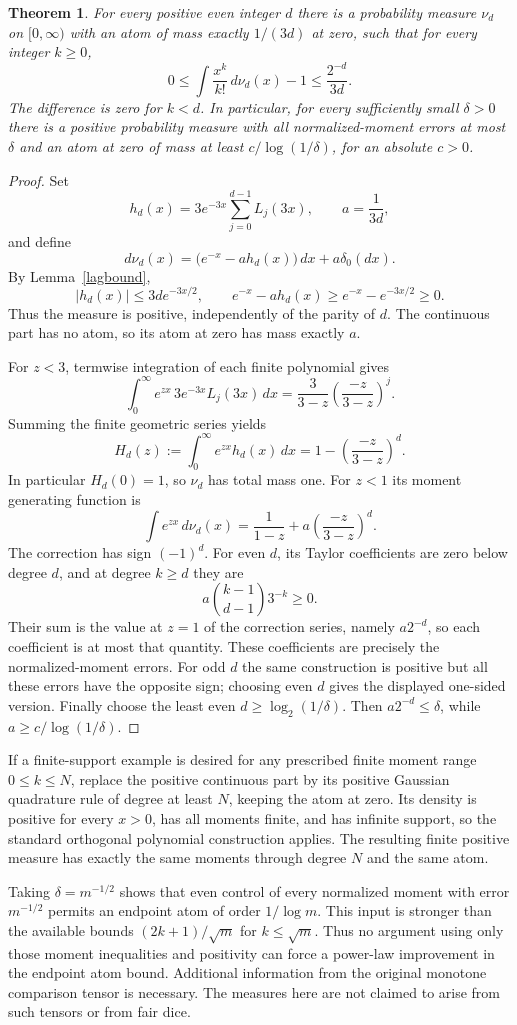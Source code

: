 \documentclass[11pt]{article}
\newtheorem{theorem}{Theorem}
\begin{document}
\begin{theorem}\label{barrier}
For every positive even integer $d$ there is a probability measure
$\nu_d$ on $[0,\infty)$ with an atom of mass exactly $1/(3d)$ at zero,
such that for every integer $k\ge0$,
\[
 0\le\int\frac{x^k}{k!}\,d\nu_d(x)-1
 \le\frac{2^{-d}}{3d}.
\]
The difference is zero for $k<d$. In particular, for every sufficiently
small $\delta>0$ there is a positive probability measure with all
normalized-moment errors at most $\delta$ and an atom at zero of mass
at least $c/\log(1/\delta)$, for an absolute $c>0$.
\end{theorem}
\begin{proof}
Set
\[
 h_d(x)=3e^{-3x}\sum_{j=0}^{d-1}L_j(3x),\qquad a=\frac1{3d},
\]
and define
\[
 d\nu_d(x)=\bigl(e^{-x}-a h_d(x)\bigr)\,dx+a\delta_0(dx).
\]
By Lemma~\ref{lagbound},
\[
 |h_d(x)|\le3d e^{-3x/2},\qquad
 e^{-x}-a h_d(x)\ge e^{-x}-e^{-3x/2}\ge0.
\]
Thus the measure is positive, independently of the parity of $d$.
The continuous part has no atom, so its atom at zero has mass exactly
$a$.

For $z<3$, termwise integration of each finite polynomial gives
\[
 \int_0^\infty e^{zx}\,3e^{-3x}L_j(3x)\,dx
 =\frac{3}{3-z}\left(\frac{-z}{3-z}\right)^j.
\]
Summing the finite geometric series yields
\[
 H_d(z):=\int_0^\infty e^{zx}h_d(x)\,dx
 =1-\left(\frac{-z}{3-z}\right)^d.
\]
In particular $H_d(0)=1$, so $\nu_d$ has total mass one.
For $z<1$ its moment generating function is
\[
 \int e^{zx}\,d\nu_d(x)
 =\frac1{1-z}+a\left(\frac{-z}{3-z}\right)^d.
\]
The correction has sign $(-1)^d$. For even $d$, its Taylor
coefficients are zero below degree $d$, and at degree $k\ge d$ they
are
\[
 a\binom{k-1}{d-1}3^{-k}\ge0.
\]
Their sum is the value at $z=1$ of the correction series, namely
$a2^{-d}$, so each coefficient is at most that quantity. These
coefficients are precisely the normalized-moment errors.
For odd $d$ the same construction is positive but all these errors
have the opposite sign; choosing even $d$ gives the displayed one-sided
version. Finally choose the least even $d\ge\log_2(1/\delta)$.
Then $a2^{-d}\le\delta$, while $a\ge c/\log(1/\delta)$.
\end{proof}

If a finite-support example is desired for any prescribed finite
moment range $0\le k\le N$, replace the positive continuous part by
its positive Gaussian quadrature rule of degree at least $N$, keeping
the atom at zero. Its density is positive for every $x>0$, has all
moments finite, and has infinite support, so the standard orthogonal
polynomial construction applies. The resulting finite positive measure
has exactly the same moments through degree $N$ and the same atom.

Taking $\delta=m^{-1/2}$ shows that even control of every normalized
moment with error $m^{-1/2}$ permits an endpoint atom of order
$1/\log m$. This input is stronger than the available bounds
$(2k+1)/\sqrt m$ for $k\le\sqrt m$. Thus no argument using only those
moment inequalities and positivity can force a power-law improvement
in the endpoint atom bound. Additional information from the original
monotone comparison tensor is necessary. The measures here are not
claimed to arise from such tensors or from fair dice.
\end{document}
